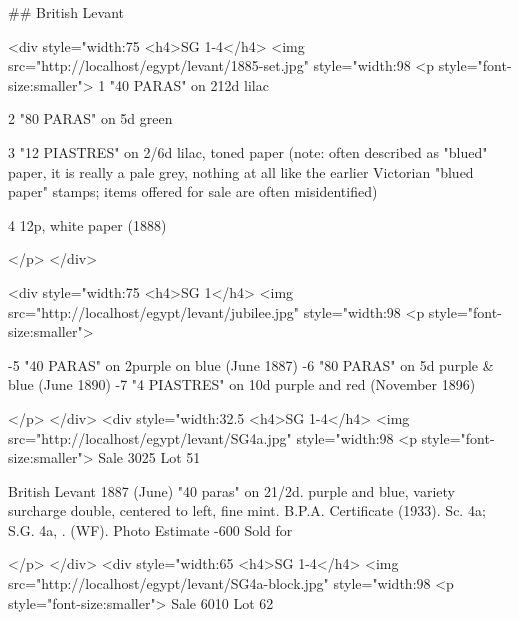 
\#\# British Levant



<div style="width:75%
<h4>SG 1-4</h4>
<img src="http://localhost/egypt/levant/1885-set.jpg" style="width:98%
<p style="font-size:smaller">
 1 "40 PARAS" on 2\frac12d lilac

2 "80 PARAS" on 5d green

3 "12 PIASTRES" on 2/6d lilac, toned paper
(note: often described as "blued" paper, it is really a pale grey, nothing at all like the earlier Victorian "blued paper" stamps; items offered for sale are often misidentified)

4 12p, white paper (1888) 

</p>
</div>







<div style="width:75%
<h4>SG 1</h4>
<img src="http://localhost/egypt/levant/jubilee.jpg" style="width:98%
<p style="font-size:smaller">

-5 "40 PARAS" on 2\halfd purple on blue (June 1887)
-6 "80 PARAS" on 5d purple & blue (June 1890)
-7 "4 PIASTRES" on 10d purple and red (November 1896) 

</p>
</div>
<div style="width:32.5%
<h4>SG 1-4</h4>
<img src="http://localhost/egypt/levant/SG4a.jpg" style="width:98%
<p style="font-size:smaller">
Sale 3025 Lot 51

British Levant
1887 (June) "40 paras" on 21/2d. purple and blue, variety surcharge double, centered to left, fine mint. B.P.A. Certificate (1933). Sc. 4a; S.G. 4a, . (WF). Photo
Estimate -600  Sold for 

</p>
</div>
<div style="width:65%
<h4>SG 1-4</h4>
<img src="http://localhost/egypt/levant/SG4a-block.jpg" style="width:98%
<p style="font-size:smaller">
Sale 6010 Lot 62

